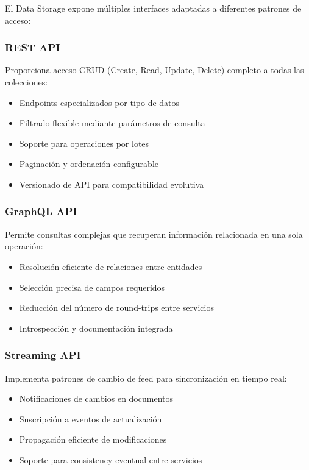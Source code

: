 \documentclass[12pt,a4paper]{article}
\begin{document}
El Data Storage expone múltiples interfaces adaptadas a diferentes patrones de acceso:

\subsubsection{REST API}
Proporciona acceso CRUD (Create, Read, Update, Delete) completo a todas las colecciones:
\begin{itemize}
    \item Endpoints especializados por tipo de datos
    \item Filtrado flexible mediante parámetros de consulta
    \item Soporte para operaciones por lotes
    \item Paginación y ordenación configurable
    \item Versionado de API para compatibilidad evolutiva
\end{itemize}

\subsubsection{GraphQL API}
Permite consultas complejas que recuperan información relacionada en una sola operación:
\begin{itemize}
    \item Resolución eficiente de relaciones entre entidades
    \item Selección precisa de campos requeridos
    \item Reducción del número de round-trips entre servicios
    \item Introspección y documentación integrada
\end{itemize}

\subsubsection{Streaming API}
Implementa patrones de cambio de feed para sincronización en tiempo real:
\begin{itemize}
    \item Notificaciones de cambios en documentos
    \item Suscripción a eventos de actualización
    \item Propagación eficiente de modificaciones
    \item Soporte para consistency eventual entre servicios
\end{itemize}
\end{document}
